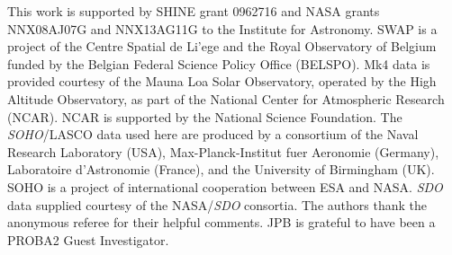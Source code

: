 \documentclass[namedreferences]{solarphysics}
\begin{document}
\begin{article}




%



%
  

%



%
 \begin{acks}
 
This work is supported by SHINE grant 0962716 and NASA grants NNX08AJ07G and NNX13AG11G to the Institute for Astronomy.
SWAP is a project of the Centre Spatial de Li'ege and the Royal Observatory of Belgium funded by the Belgian Federal Science Policy Office (BELSPO).
Mk4 data is provided courtesy of the Mauna Loa Solar Observatory, operated by the High Altitude Observatory, as part of the National Center for Atmospheric Research (NCAR). NCAR is supported by the National Science Foundation.
The \emph{SOHO}/LASCO data used here are produced by a consortium of the Naval Research Laboratory (USA), Max-Planck-Institut fuer Aeronomie (Germany), Laboratoire d'Astronomie (France), and the University of Birmingham (UK). SOHO is a project of international cooperation between ESA and NASA.
\emph{SDO} data supplied courtesy of the NASA/\emph{SDO} consortia. The authors thank the anonymous referee for their helpful comments. JPB is grateful to have been a PROBA2 Guest Investigator.

 \end{acks}


%
%
 
   
%
%
%   
%  

\end{article} 
\end{document}
